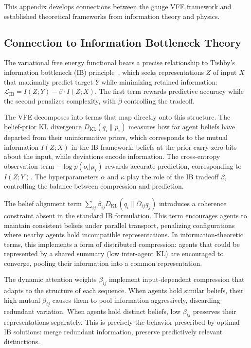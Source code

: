 \documentclass[twoside,11pt]{article}
\begin{document}
This appendix develops connections between the gauge VFE framework and established theoretical frameworks from information theory and physics.

\subsection{Connection to Information Bottleneck Theory}

The variational free energy functional bears a precise relationship to Tishby's information bottleneck (IB) principle~\citep{tishby2000information}, which seeks representations $Z$ of input $X$ that maximally predict target $Y$ while minimizing retained information: $\mathcal{L}_{\mathrm{IB}} = I(Z; Y) - \beta \cdot I(Z; X)$. The first term rewards predictive accuracy while the second penalizes complexity, with $\beta$ controlling the tradeoff.

The VFE decomposes into terms that map directly onto this structure. The belief-prior KL divergence $D_{\mathrm{KL}}(q_i \| p_i)$ measures how far agent beliefs have departed from their uninformative priors, which corresponds to the mutual information $I(Z; X)$ in the IB framework: beliefs at the prior carry zero bits about the input, while deviations encode information. The cross-entropy observation term $-\log p(o_i | \mu_i)$ rewards accurate prediction, corresponding to $I(Z; Y)$. The hyperparameters $\alpha$ and $\kappa$ play the role of the IB tradeoff $\beta$, controlling the balance between compression and prediction.

The belief alignment term $\sum_{ij} \beta_{ij} D_{\mathrm{KL}}(q_i \| \Omega_{ij} q_j)$ introduces a coherence constraint absent in the standard IB formulation. This term encourages agents to maintain consistent beliefs under parallel transport, penalizing configurations where nearby agents hold incompatible representations. In information-theoretic terms, this implements a form of distributed compression: agents that could be represented by a shared summary (low inter-agent KL) are encouraged to converge, pooling their information into a common representation.

The dynamic attention weights $\beta_{ij}$ implement input-dependent compression that adapts to the structure of each sequence. When agents hold similar beliefs, their high mutual $\beta_{ij}$ causes them to pool information aggressively, discarding redundant variation. When agents hold distinct beliefs, low $\beta_{ij}$ preserves their representations separately. This is precisely the behavior prescribed by optimal IB solutions: merge redundant information, preserve predictively relevant distinctions.
\end{document}
